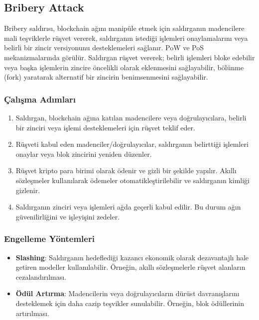 \newpage

\subsection{Bribery Attack}

Bribery saldırısı, blockchain ağını manipüle etmek için saldırganın madencilere mali teşviklerle rüşvet vererek, saldırganın istediği işlemleri onaylamalarını veya belirli bir zincir versiyonunu desteklemeleri sağlanır. PoW ve PoS mekanizmalarında görülür. Saldırgan rüşvet vererek; belirli işlemleri bloke edebilir veya başka işlemlerin zincire öncelikli olarak eklenmesini sağlayabilir, bölünme (fork) yaratarak alternatif bir zincirin benimsenmesini sağlayabilir.

\subsubsection{Çalışma Adımları}

\begin{enumerate}
    \item Saldırgan, blockchain ağına katılan madencilere veya doğrulayıcılara, belirli bir zinciri veya işlemi desteklemeleri için rüşvet teklif eder.
    \item Rüşveti kabul eden madenciler/doğrulayıcılar, saldırganın belirttiği işlemleri onaylar veya blok zincirini yeniden düzenler.
    \item Rüşvet kripto para birimi olarak ödenir ve gizli bir şekilde yapılır. Akıllı sözleşmeler kullanılarak ödemeler otomatikleştirilebilir ve saldırganın kimliği gizlenir.
    \item Saldırganın zinciri veya işlemleri ağda geçerli kabul edilir. Bu durum ağın güvenilirliğini ve işleyişini zedeler.
\end{enumerate}

\subsubsection{Engelleme Yöntemleri}

\begin{itemize}
    \item \textbf{Slashing}: Saldırganın hedeflediği kazancı ekonomik olarak dezavantajlı hale getiren modeller kullanılabilir. Örneğin, akıllı sözleşmelerle rüşvet alanların cezalandırılması.
    \item \textbf{Ödül Artırma}: Madencilerin veya doğrulayıcıların dürüst davranışlarını desteklemek için daha cazip teşvikler sunulabilir. Örneğin, blok ödüllerinin artırılması.
\end{itemize}

